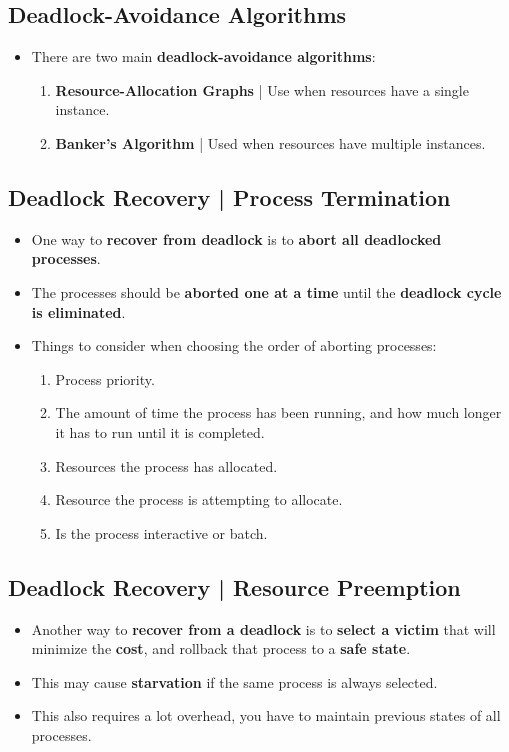 \documentclass{article}
\begin{document}
    \subsection*{Deadlock-Avoidance Algorithms}
    \begin{itemize}
        \item There are two main \textbf{deadlock-avoidance algorithms}:
        \begin{enumerate}
            \item \textbf{Resource-Allocation Graphs} | Use when resources have a single instance.
            \item \textbf{Banker's Algorithm} | Used when resources have multiple instances.
        \end{enumerate}
    \end{itemize}

    \subsection*{Deadlock Recovery | Process Termination}
    \begin{itemize}
        \item One way to \textbf{recover from deadlock} is to \textbf{abort all deadlocked processes}.
        \item The processes should be \textbf{aborted one at a time} until the \textbf{deadlock cycle is eliminated}.
        \item Things to consider when choosing the order of aborting processes:
        \begin{enumerate}
            \item Process priority.
            \item The amount of time the process has been running, and how much longer it has to run until it is completed.
            \item Resources the process has allocated.
            \item Resource the process is attempting to allocate.
            \item Is the process interactive or batch.
        \end{enumerate}
    \end{itemize}

    \subsection*{Deadlock Recovery | Resource Preemption}
    \begin{itemize}
        \item Another way to \textbf{recover from a deadlock} is to \textbf{select a victim} that will minimize the \textbf{cost}, and rollback that process to a \textbf{safe state}.
        \item This may cause \textbf{starvation} if the same process is always selected.
        \item This also requires a lot overhead, you have to maintain previous states of all processes.
    \end{itemize}
\end{document}
